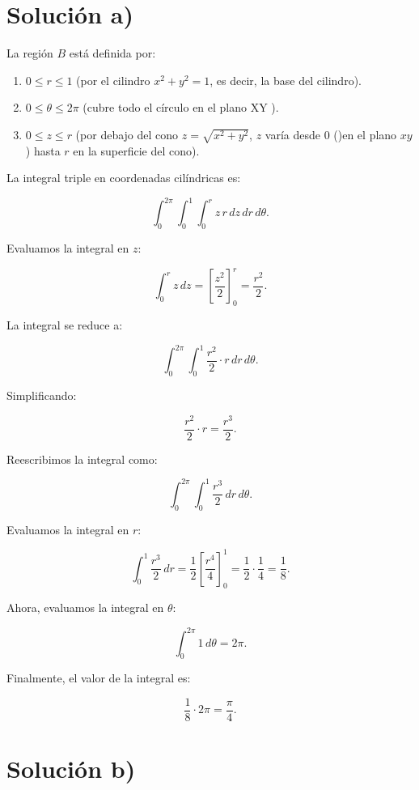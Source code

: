 \section*{ Solución a)}
	
	La región \( B \) está definida por:
	
	\begin{enumerate}
		\item  \( 0 \leq r \leq 1 \) (por el cilindro \( x^2 + y^2 = 1 \), es decir, la base del cilindro).
		\item  \( 0 \leq \theta \leq 2\pi \) (cubre todo el círculo en el plano XY ).
		\item  \( 0 \leq z \leq r \) (por debajo del cono \( z = \sqrt{x^2 + y^2} \), \( z \) varía desde 0 ()en el plano \( xy \)) hasta \( r \) en la superficie del cono).
	\end{enumerate}
	
	La integral triple en coordenadas cilíndricas es:
	
	\[
	\int_0^{2\pi} \int_0^1 \int_0^r z \, r \, dz \, dr \, d\theta.
	\]
	
	Evaluamos la integral en \( z \):
	
	\[
	\int_0^r z \, dz = \left[ \frac{z^2}{2} \right]_0^r = \frac{r^2}{2}.
	\]
	
	La integral se reduce a:
	
	\[
	\int_0^{2\pi} \int_0^1 \frac{r^2}{2} \cdot r \, dr \, d\theta.
	\]
	
	Simplificando:
	
	\[
	\frac{r^2}{2} \cdot r = \frac{r^3}{2}.
	\]
	
	Reescribimos la integral como:
	
	\[
	\int_0^{2\pi} \int_0^1 \frac{r^3}{2} \, dr \, d\theta.
	\]
	
	Evaluamos la integral en \( r \):
	
	\[
	\int_0^1 \frac{r^3}{2} \, dr = \frac{1}{2} \left[ \frac{r^4}{4} \right]_0^1 = \frac{1}{2} \cdot \frac{1}{4} = \frac{1}{8}.
	\]
	
	Ahora, evaluamos la integral en \( \theta \):
	
	\[
	\int_0^{2\pi} 1 \, d\theta = 2\pi.
	\]
	
	Finalmente, el valor de la integral es:
	
	\[
	\frac{1}{8} \cdot 2\pi = \boxed {\frac{\pi}{4}}.
	\]
	
	\section*{ Solución b)}
	
